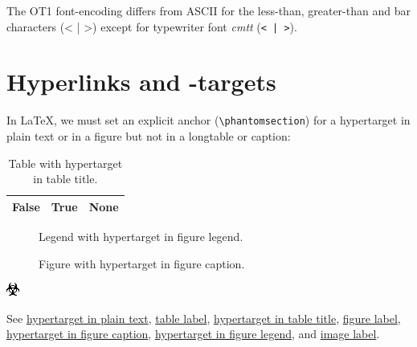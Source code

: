\documentclass[a4paper]{article}
\newlength{\DUtablewidth} %
\newenvironment{DUlegend}{\small}{}
\providecommand*{\DUroletitlereference}[1]{\textsl{#1}}
\begin{document}
The OT1 font-encoding differs from ASCII for the less-than, greater-than
and bar characters (< | >) except for typewriter font \DUroletitlereference{cmtt}
(\texttt{< | >}).


\section{Hyperlinks and -targets%
  \label{hyperlinks-and-targets}%
}

In LaTeX, we must set an explicit anchor (\texttt{\textbackslash{}phantomsection}) for a
%
\label{hypertarget-in-plain-text}hypertarget in plain text or in a figure but not in a longtable or
caption:

\setlength{\DUtablewidth}{\linewidth}%
\begin{longtable}{|p{0.075\DUtablewidth}|p{0.075\DUtablewidth}|p{0.075\DUtablewidth}|}
\caption{Table with %
\label{hypertarget-in-table-title}hypertarget in table title.}\\
\hline

False
 & 
True
 & 
None
 \\
\hline
\end{longtable}
\label{table-label}

\begin{figure}
\label{figure-label}
\noindent{}
\caption{Figure with %
\label{hypertarget-in-figure-caption}hypertarget in figure caption.}
\begin{DUlegend}
Legend with %
\label{hypertarget-in-figure-legend}hypertarget in figure legend.
\end{DUlegend}
\end{figure}

\includegraphics{../../../docs/user/rst/images/biohazard.png}
\label{image-label}

See \hyperref[hypertarget-in-plain-text]{hypertarget in plain text},
\hyperref[table-label]{table label}, \hyperref[hypertarget-in-table-title]{hypertarget in table title},
\hyperref[figure-label]{figure label}, \hyperref[hypertarget-in-figure-caption]{hypertarget in figure caption},
\hyperref[hypertarget-in-figure-legend]{hypertarget in figure legend}, and
\hyperref[image-label]{image label}.
\end{document}
